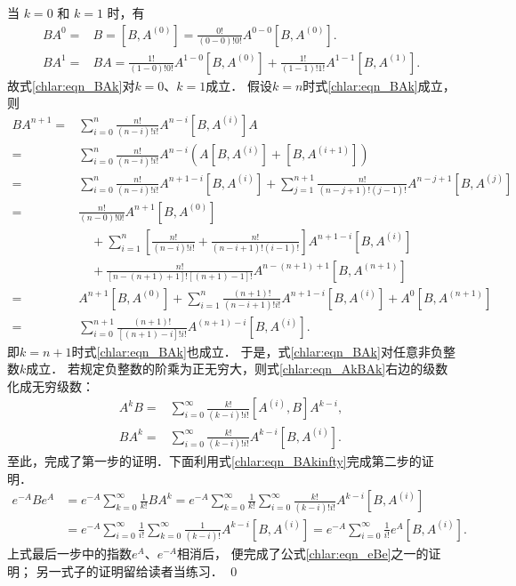 当 $k=0$ 和 $k=1$ 时，有
\begin{align*}
	B A^0=&B=\left[B, A^{(0)}\right]=\frac{0!}{(0-0)!0!} A^{0-0}\left[B, A^{(0)}\right] .\\
	B A^1=&B A=\frac{1!}{(1-0)!0!} A^{1-0}\left[B, A^{(0)}\right]+\frac{1!}{(1-1)!1!} A^{1-1}\left[B, A^{(1)}\right] .
\end{align*}
故式\eqref{chlar:eqn_BAk}对$k=0$、$k=1$成立．
假设$k=n$时式\eqref{chlar:eqn_BAk}成立，则
\begin{align*}
	B A^{n+1}= & \sum_{i=0}^n \frac{n!}{(n-i)!i!} A^{n-i}\left[B, A^{(i)}\right] A \\
	= & \sum_{i=0}^n \frac{n!}{(n-i)!i!} A^{n-i}\left(A\left[B, A^{(i)}\right]+\left[B, A^{(i+1)}\right]\right) \\
	= & \sum_{i=0}^n \frac{n!}{(n-i)!i!} A^{n+1-i}\left[B, A^{(i)}\right]
	 +\sum_{j=1}^{n+1} \frac{n!}{(n-j+1)!(j-1)!} A^{n-j+1}\left[B, A^{(j)}\right] \\
	= & \frac{n!}{(n-0)!0!} A^{n+1}\left[B, A^{(0)}\right] \\
	&\quad +\sum_{i=1}^n\left[\frac{n!}{(n-i)!i!}+\frac{n!}{(n-i+1)!(i-1)!}\right] A^{n+1-i}\left[B, A^{(i)}\right] \\
	& \quad +\frac{n!}{[n-(n+1)+1]![(n+1)-1]!} A^{n-(n+1)+1}\left[B, A^{(n+1)}\right] \\
	= & A^{n+1}\left[B, A^{(0)}\right]+\sum_{i=1}^n\frac{(n+1)!}{(n-i+1)!i!} A^{n+1-i}\left[B, A^{(i)}\right] 
	 +A^{0}\left[B, A^{(n+1)}\right] \\
	= & \sum_{i=0}^{n+1} \frac{(n+1)!}{[(n+1)-i]!i!} A^{(n+1)-i}\left[B, A^{(i)}\right] .
\end{align*}
即$k=n+1$时式\eqref{chlar:eqn_BAk}也成立．
于是，式\eqref{chlar:eqn_BAk}对任意非负整数$k$成立．
若规定负整数的阶乘为正无穷大，则式\eqref{chlar:eqn_AkBAk}右边的级数化成无穷级数：
\begin{subequations}\label{chlar:eqn_BAkinfty}
	\begin{align}
	A^k B= & \sum_{i=0}^{\infty} \frac{k!}{(k-i)!i!}\left[A^{(i)}, B\right] A^{k-i},  \\
	B A^k= & \sum_{i=0}^{\infty} \frac{k!}{(k-i)!i!} A^{k-i}\left[B, A^{(i)}\right] .
	\end{align}
\end{subequations}
至此，完成了第一步的证明．下面利用式\eqref{chlar:eqn_BAkinfty}完成第二步的证明．
\begin{align*}
	{e}^{-A} B {e}^A & ={e}^{-A} \sum_{k=0}^{\infty} \frac{1}{k!} B A^k
	={e}^{-A} \sum_{k=0}^{\infty} \frac{1}{k!} \sum_{i=0}^{\infty} \frac{k!}{(k-i)!i!} A^{k-i}\left[B, A^{(i)}\right] \\
  & ={e}^{-A} \sum_{i=0}^{\infty} \frac{1}{i!} \sum_{k=0}^{\infty} \frac{1}{(k-i)!} A^{k-i}\left[B, A^{(i)}\right]
	={e}^{-A} \sum_{i=0}^{\infty} \frac{1}{i!} {e}^A\left[B, A^{(i)}\right] .
\end{align*}
上式最后一步中的指数$e^A$、$e^{-A}$相消后，
便完成了公式\eqref{chlar:eqn_eBe}之一的证明；
另一式子的证明留给读者当练习．
\qed


